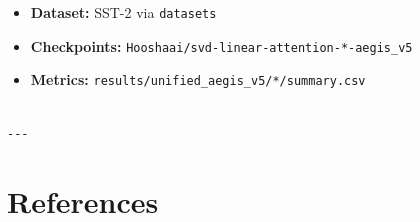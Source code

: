 \begin{itemize}
\item \textbf{Dataset:} SST-2 via \texttt{datasets}
\item \textbf{Checkpoints:} \texttt{Hooshaai/svd-linear-attention-*-aegis\_v5}
\item \textbf{Metrics:} \texttt{results/unified\_aegis\_v5/*/summary.csv}
\end{itemize}
\begin{lstlisting}

---
\end{lstlisting}

\section{References}

